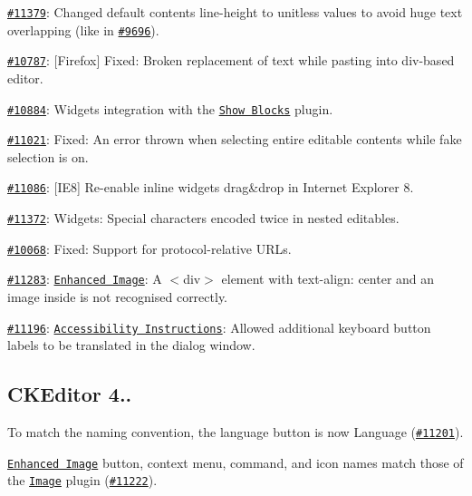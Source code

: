 {\begin{DoxyItemize}
\item \href{http://dev.ckeditor.com/ticket/11379}{\tt \#11379}\+: Changed default contents {\ttfamily line-\/height} to unitless values to avoid huge text overlapping (like in \href{http://dev.ckeditor.com/ticket/9696}{\tt \#9696}).
\item \href{http://dev.ckeditor.com/ticket/10787}{\tt \#10787}\+: \mbox{[}Firefox\mbox{]} Fixed\+: Broken replacement of text while pasting into {\ttfamily div}-\/based editor.
\item \href{http://dev.ckeditor.com/ticket/10884}{\tt \#10884}\+: Widgets integration with the \href{http://ckeditor.com/addon/showblocks}{\tt Show Blocks} plugin.
\item \href{http://dev.ckeditor.com/ticket/11021}{\tt \#11021}\+: Fixed\+: An error thrown when selecting entire editable contents while fake selection is on.
\item \href{http://dev.ckeditor.com/ticket/11086}{\tt \#11086}\+: \mbox{[}I\+E8\mbox{]} Re-\/enable inline widgets drag\&drop in Internet Explorer 8.
\item \href{http://dev.ckeditor.com/ticket/11372}{\tt \#11372}\+: Widgets\+: Special characters encoded twice in nested editables.
\item \href{http://dev.ckeditor.com/ticket/10068}{\tt \#10068}\+: Fixed\+: Support for protocol-\/relative U\+R\+Ls.
\item \href{http://dev.ckeditor.com/ticket/11283}{\tt \#11283}\+: \href{http://ckeditor.com/addon/image2}{\tt Enhanced Image}\+: A {\ttfamily $<$div$>$} element with {\ttfamily text-\/align\+: center} and an image inside is not recognised correctly.
\item \href{http://dev.ckeditor.com/ticket/11196}{\tt \#11196}\+: \href{http://ckeditor.com/addon/a11yhelp}{\tt Accessibility Instructions}\+: Allowed additional keyboard button labels to be translated in the dialog window.
\end{DoxyItemize}}

{\ttfamily \subsection*{C\+K\+Editor 4..}}

{\ttfamily }

{}

{\ttfamily 
\begin{DoxyItemize}
\item To match the naming convention, the {\ttfamily language} button is now {\ttfamily Language} (\href{http://dev.ckeditor.com/ticket/11201}{\tt \#11201}).
\item \href{http://ckeditor.com/addon/image2}{\tt Enhanced Image} button, context menu, command, and icon names match those of the \href{http://ckeditor.com/addon/image}{\tt Image} plugin (\href{http://dev.ckeditor.com/ticket/11222}{\tt \#11222}).
\end{DoxyItemize}}

